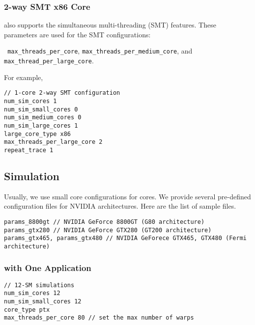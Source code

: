 
\subsubsection{2-way SMT x86 Core}

\SIM also supports the simultaneous multi-threading (SMT) features.
These parameters are used for the SMT configurations:

\Verb+ max_threads_per_core+, \Verb+max_threads_per_medium_core+, and
\Verb+max_thread_per_large_core+. 

\noindent
For example,

\begin{Verbatim}
// 1-core 2-way SMT configuration
num_sim_cores 1
num_sim_small_cores 0
num_sim_medium_cores 0
num_sim_large_cores 1
large_core_type x86
max_threads_per_large_core 2
repeat_trace 1
\end{Verbatim}



\subsection{\gpu Simulation}

Usually, we use small core configurations for \gpu cores. We provide
several pre-defined configuration files for NVIDIA architectures. Here
are the list of sample files.

\begin{Verbatim}
params_8800gt // NVIDIA GeForce 8800GT (G80 architecture)
params_gtx280 // NVIDIA GeForce GTX280 (GT200 architecture)
params_gtx465, params_gtx480 // NVIDIA GeForece GTX465, GTX480 (Fermi architecture)
\end{Verbatim}


\subsubsection{\gpu with One Application}

\begin{Verbatim}
// 12-SM simulations
num_sim_cores 12
num_sim_small_cores 12
core_type ptx
max_threads_per_core 80 // set the max number of warps 
\end{Verbatim}


